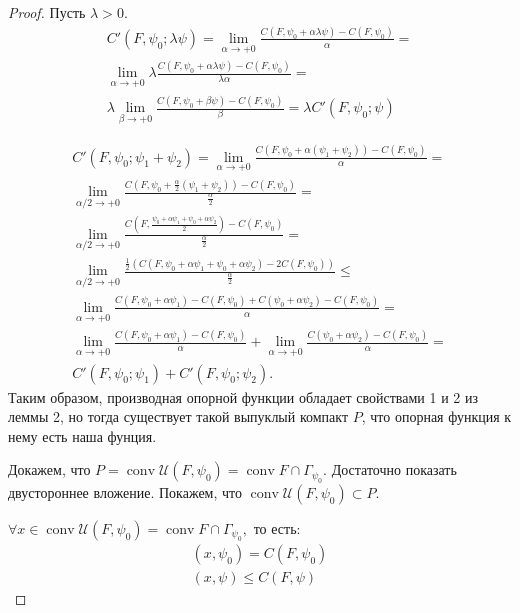 \begin{proof}
    Пусть $\lambda > 0$.
    \begin{multline*}
        C'(F, \psi_0; \lambda \psi) = \lim\limits_{\alpha \to +0} \frac{C(F, \psi_0 + \alpha \lambda \psi) - C(F, \psi_0)}{\alpha} = \\
        \lim\limits_{\alpha \to +0} \lambda \frac{C(F, \psi_0 + \alpha \lambda \psi) - C(F, \psi_0)}{\lambda \alpha} = \\
        \lambda \lim\limits_{\beta \to +0} \frac{C(F, \psi_0 + \beta \psi) - C(F, \psi_0)}{\beta} = \lambda C'(F, \psi_0; \psi)
    \end{multline*}

    \begin{multline*}
        C'(F, \psi_0; \psi_1 + \psi_2) = \lim\limits_{\alpha \to +0} \frac{C(F, \psi_0 + \alpha(\psi_1 + \psi_2)) - C(F, \psi_0)}{\alpha} = \\
        \lim\limits_{\alpha/2 \to +0} \frac{C(F, \psi_0 + \frac{\alpha}{2}(\psi_1 + \psi_2)) - C(F, \psi_0)}{\frac{\alpha}{2}} = \\
        \lim\limits_{\alpha/2 \to +0} \frac{C(F, \frac{\psi_0 + \alpha \psi_1 + \psi_0 + \alpha \psi_2}{2}) - C(F, \psi_0)}{\frac{\alpha}{2}} = \\
        \lim\limits_{\alpha/2 \to +0} \frac{\frac{1}{2} ( C(F, \psi_0 + \alpha \psi_1 + \psi_0 + \alpha \psi_2) - 2C(F, \psi_0))}{\frac{\alpha}{2}} \leqslant \\
        \lim\limits_{\alpha \to +0} \frac{ C(F, \psi_0 + \alpha \psi_1) - C(F, \psi_0) +  C(\psi_0 + \alpha \psi_2) - C(F, \psi_0)}{\alpha} = \\
        \lim\limits_{\alpha \to +0} \frac{ C(F, \psi_0 + \alpha \psi_1) - C(F, \psi_0)}{\alpha} + \lim\limits_{\alpha \to +0} \frac{C(\psi_0 + \alpha \psi_2) - C(F, \psi_0)}{\alpha}= \\
        C'(F, \psi_0; \psi_1) + C'(F, \psi_0; \psi_2).
    \end{multline*}
    Таким образом, производная опорной функции обладает свойствами 1 и 2 из леммы 2, 
    но тогда существует такой выпуклый компакт $P$, что опорная функция к нему есть наша фунция.

    Докажем, что $P = \operatorname{conv}\mathcal{U}(F, \psi_0) = \operatorname{conv} F \cap \Gamma_{\psi_0}$.
    Достаточно показать двустороннее вложение. 
    Покажем, что $\operatorname{conv}\mathcal{U}(F, \psi_0) \subset P$.

    $\forall x \in \operatorname{conv}\mathcal{U}(F, \psi_0) = \operatorname{conv} F \cap \Gamma_{\psi_0}, $ то есть:
    \begin{gather*}
        (x, \psi_0) = C(F, \psi_0) \\
        (x, \psi) \leqslant C(F, \psi)
    \end{gather*}
    

\end{proof}
